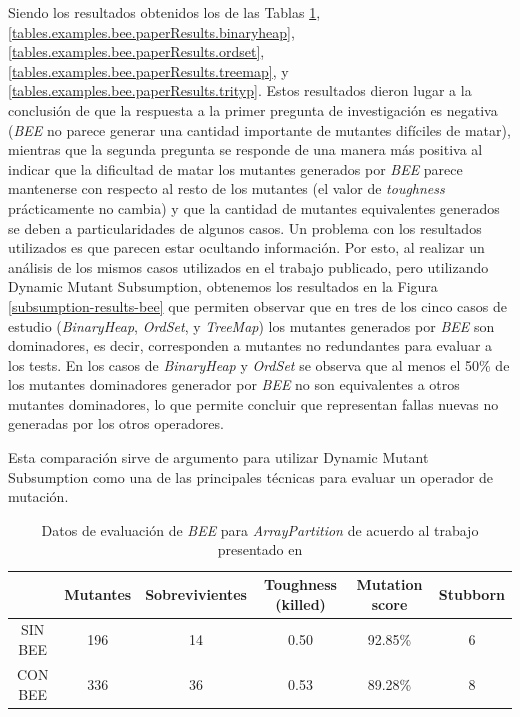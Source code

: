 Siendo los resultados obtenidos los de las Tablas \ref{tables.examples.bee.paperResults.arraypartition}, \ref{tables.examples.bee.paperResults.binaryheap}, \ref{tables.examples.bee.paperResults.ordset}, \ref{tables.examples.bee.paperResults.treemap}, y \ref{tables.examples.bee.paperResults.trityp}. Estos resultados dieron lugar a la conclusi\'on de que la respuesta a la primer pregunta de investigaci\'on es negativa (\emph{BEE} no parece generar una cantidad importante de mutantes dif\'iciles de matar), mientras que la segunda pregunta se responde de una manera m\'as positiva al indicar que la dificultad de matar los mutantes generados por \emph{BEE} parece mantenerse con respecto al resto de los mutantes (el valor de \emph{toughness} pr\'acticamente no cambia) y que la cantidad de mutantes equivalentes generados se deben a particularidades de algunos casos. Un problema con los resultados utilizados es que parecen estar ocultando informaci\'on. Por esto, al realizar un an\'alisis de los mismos casos utilizados en el trabajo publicado, pero utilizando Dynamic Mutant Subsumption, obtenemos los resultados en la Figura \ref{subsumption-results-bee} que permiten observar que en tres de los cinco casos de estudio (\emph{BinaryHeap}, \emph{OrdSet}, y \emph{TreeMap}) los mutantes generados por \emph{BEE} son dominadores, es decir, corresponden a mutantes no redundantes para evaluar a los tests. En los casos de \emph{BinaryHeap} y \emph{OrdSet} se observa que al menos el 50\% de los mutantes dominadores generador por \emph{BEE} no son equivalentes a otros mutantes dominadores, lo que permite concluir que representan fallas nuevas no generadas por los otros operadores.

Esta comparaci\'on sirve de argumento para utilizar Dynamic Mutant Subsumption como una de las principales t\'ecnicas para evaluar un operador de mutaci\'on.

\begin{table}[]
	\centering
	\scriptsize
	\def\arraystretch{0.95}
	\setlength\tabcolsep{0.5mm}
	\begin{tabular}{c|ccccc|}
		\cline{2-6}
		& Mutantes & Sobrevivientes & Toughness (killed) & Mutation score & Stubborn \\ \hline
		\multicolumn{1}{|c|}{SIN BEE} & 196 & 14 & 0.50 & 92.85\% & 6 \\ \hline
		\multicolumn{1}{|c|}{CON BEE} & 336 & 36 & 0.53 & 89.28\% & 8 \\ \hline
	\end{tabular}
	\caption{Datos de evaluaci\'on de \emph{BEE} para \emph{ArrayPartition} de acuerdo al trabajo presentado en \cite{bibliography.mutation.operators.beeBridaS17}}
	\label{tables.examples.bee.paperResults.arraypartition}
\end{table}

